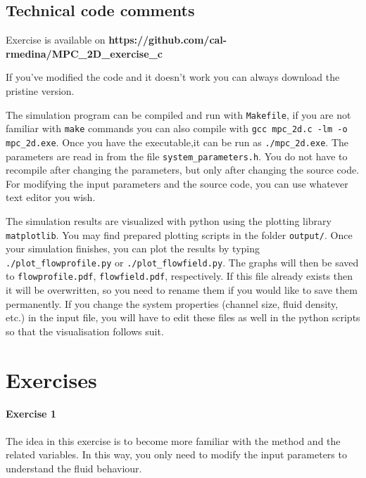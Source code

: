 \documentclass[sizes,12pt,nftimes]{article}
\begin{document}
\subsection*{Technical code comments }

Exercise is available on \mbox{\bf https://github.com/cal-rmedina/MPC\_2D\_exercise\_c} 
 
\noindent If you've modified the code and it doesn't work you can always download the pristine version.
 
\vspace*{0.2cm}
The simulation program can be compiled and run with \mbox{\texttt{Makefile}}, 
if you are not familiar with \mbox{\texttt{make}} commands you can also compile
with \mbox{\texttt{gcc mpc\_2d.c -lm -o mpc\_2d.exe}}. 
Once you have the executable,it can be run as \mbox{\texttt{./mpc\_2d.exe}}. 
The parameters are read in from the file \mbox{\texttt{system\_parameters.h}}.
You do not have to recompile after changing the parameters, but only after changing
the source code. For modifying the input parameters and the source code,
you can use whatever text editor you wish. 

  
The simulation results are visualized with python using the plotting
library \mbox{\texttt{matplotlib}}. You may find prepared plotting scripts in the
folder \mbox{\texttt{output/}}. Once your simulation finishes, you can
plot the results by typing \mbox{\texttt{./plot\_flowprofile.py}} or
\mbox{\texttt{./plot\_flowfield.py}}. The graphs will then be saved to
\mbox{\texttt{flowprofile.pdf}}, \mbox{\texttt{flowfield.pdf}},
respectively. If this file already exists then it will be overwritten,
so you need to rename them if you would like to save them
permanently. If you change the system properties (channel size, fluid
density, etc.) in the input file, you will have to edit these files as
well in the python scripts so that the visualisation follows suit.
  
\newpage
\section*{Exercises}
 
\paragraph*{Exercise 1} The idea in this exercise is to become more familiar
with the method and the related variables. In this way, you only need
to modify the input parameters to understand the fluid behaviour.
\end{document}

